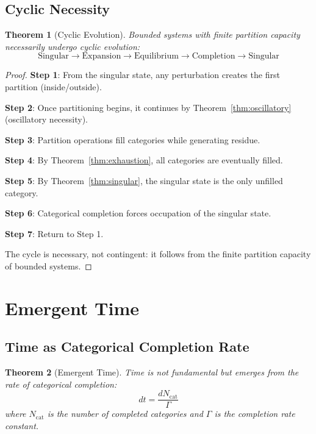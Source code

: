 \documentclass[twocolumn,10pt,a4paper]{article}
\newtheorem{theorem}{Theorem}[section]
\theoremstyle{definition}
\theoremstyle{remark}
\begin{document}
\subsection{Cyclic Necessity}

\begin{theorem}[Cyclic Evolution]
\label{thm:cyclic}
Bounded systems with finite partition capacity necessarily undergo cyclic evolution:
\begin{equation}
    \text{Singular} \to \text{Expansion} \to \text{Equilibrium} \to \text{Completion} \to \text{Singular}
\end{equation}
\end{theorem}

\begin{proof}
\textbf{Step 1}: From the singular state, any perturbation creates the first partition (inside/outside).

\textbf{Step 2}: Once partitioning begins, it continues by Theorem~\ref{thm:oscillatory} (oscillatory necessity).

\textbf{Step 3}: Partition operations fill categories while generating residue.

\textbf{Step 4}: By Theorem~\ref{thm:exhaustion}, all categories are eventually filled.

\textbf{Step 5}: By Theorem~\ref{thm:singular}, the singular state is the only unfilled category.

\textbf{Step 6}: Categorical completion forces occupation of the singular state.

\textbf{Step 7}: Return to Step 1.

The cycle is necessary, not contingent: it follows from the finite partition capacity of bounded systems.
\end{proof}

\section{Emergent Time}
\label{sec:time}

\subsection{Time as Categorical Completion Rate}

\begin{theorem}[Emergent Time]
\label{thm:time}
Time is not fundamental but emerges from the rate of categorical completion:
\begin{equation}
    dt = \frac{dN_{\text{cat}}}{\Gamma}
\end{equation}
where $N_{\text{cat}}$ is the number of completed categories and $\Gamma$ is the completion rate constant.
\end{theorem}
\end{document}
